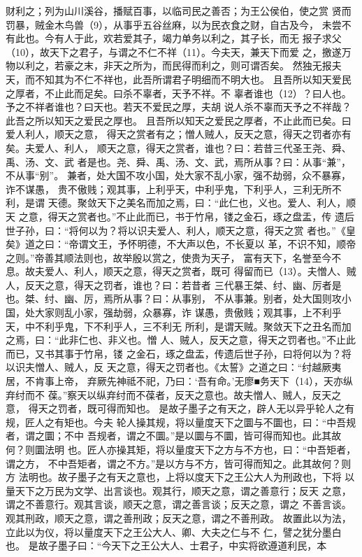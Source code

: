 \documentclass[12pt,UTF8]{ctexbook}
\begin{document}
财利之；列为山川溪谷，播赋百事，以临司民之善否；为王公侯伯，使之赏 
贤而罚暴，贼金木鸟兽（9），从事乎五谷丝麻，以为民衣食之财，自古及今， 
未尝不有此也。今有人于此，欢若爱其子，竭力单务以利之，其子长，而无 
报子求父（10），故天下之君子，与谓之不仁不祥（11）。今夫天，兼天下而爱 
之，撽遂万物以利之，若豪之末，非天之所为，而民得而利之，则可谓否矣。 
然独无报夫天，而不知其为不仁不祥也，此吾所谓君子明细而不明大也。 
且吾所以知天爱民之厚者，不止此而足矣。曰杀不辜者，天予不祥。不 
辜者谁也（12）？曰人也。予之不祥者谁也？曰天也。若天不爱民之厚，夫胡 
说人杀不辜而天予之不祥哉？此吾之所以知天之爱民之厚也。 
且吾所以知天之爱民之厚者，不止此而已矣。曰爱人利人，顺天之意， 
得天之赏者有之；憎人贼人，反天之意，得天之罚者亦有矣。夫爱人、利人， 
顺天之意，得天之赏者，谁也？曰：若昔三代圣王尧、舜、禹、汤、文、武 
者是也。尧、舜、禹、汤、文、武，焉所从事？曰：从事“兼”，不从事“别”。 
兼者，处大国不攻小国，处大家不乱小家，强不劫弱，众不暴寡，诈不谋愚， 
贵不傲贱；观其事，上利乎天，中利乎鬼，下利乎人，三利无所不利，是谓 
天德。聚敛天下之美名而加之焉，曰：“此仁也，义也。爱人、利人，顺天 
之意，得天之赏者也。”不止此而已，书于竹帛，镂之金石，琢之盘盂，传 
遗后世子孙，曰：“将何以为？将以识夫爱人、利人，顺天之意，得天之赏 
者也。”《皇矣》道之曰：“帝谓文王，予怀明德，不大声以色，不长夏以 
革，不识不知，顺帝之则。”帝善其顺法则也，故举殷以赏之，使贵为天子， 
富有天下，名誉至今不息。故夫爱人、利人，顺天之意，得天之赏者，既可 
得留而已（13）。夫憎人、贼人，反天之意，得天之罚者，谁也？曰：若昔者 
三代暴王桀、纣、幽、厉者是也。桀、纣、幽、厉，焉所从事？曰：从事别， 
不从事兼。别者，处大国则攻小国，处大家则乱小家，强劫弱，众暴寡，诈 
谋愚，贵傲贱；观其事，上不利乎天，中不利乎鬼，下不利乎人，三不利无 
所利，是谓天贼。聚敛天下之丑名而加之焉，曰：“此非仁也、非义也。憎 
人、贼人，反天之意，得天之罚者也。”不止此而已，又书其事于竹帛，镂 
之金石，琢之盘盂，传遗后世子孙，曰将何以为？将以识夫憎人、贼人，反 
天之意，得天之罚者也。《太誓》之道之曰：“纣越厥夷居，不肯事上帝， 
弃厥先神祗不祀，乃曰：‘吾有命。’无廖■务天下（14），天亦纵弃纣而不 
葆。”察天以纵弃纣而不葆者，反天之意也。故夫憎人、贼人，反天之意， 
得天之罚者，既可得而知也。 
是故子墨子之有天之，辟人无以异乎轮人之有规，匠人之有矩也。今夫 
轮人操其规，将以量度天下之圜与不圜也，曰：“中吾规者，谓之圜；不中 
吾规者，谓之不圜。”是以圜与不圜，皆可得而知也。此其故何？则圜法明 
也。匠人亦操其矩，将以量度天下之方与不方也，曰：“中吾矩者，谓之方， 
不中吾矩者，谓之不方。”是以方与不方，皆可得而知之。此其故何？则方 
法明也。故子墨子之有天之意也，上将以度天下之王公大人为刑政也，下将 
以量天下之万民为文学、出言谈也。观其行，顺天之意，谓之善意行；反天 
之意，谓之不善意行。观其言谈，顺天之意，谓之善言谈；反天之意，谓之 
不善言谈。观其刑政，顺天之意，谓之善刑政；反天之意，谓之不善刑政。 
故置此以为法，立此以为仪，将以量度天下之王公大人、卿、大夫之仁与不 
仁，譬之犹分墨白也。 
是故子墨子曰：“今天下之王公大人、士君子，中实将欲遵道利民，本 
\end{document}
